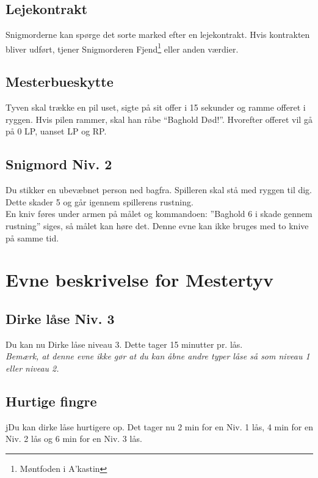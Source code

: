 


\subsection{Lejekontrakt}
Snigmorderne kan spørge det sorte marked efter en lejekontrakt. Hvis kontrakten
bliver udført, tjener Snigmorderen Fjend\footnote{Møntfoden i A'kastin} eller anden værdier.\\

\subsection{Mesterbueskytte}
Tyven skal trække en pil uset, sigte på sit offer i 15 sekunder og ramme offeret i ryggen. Hvis pilen rammer, skal han råbe “Baghold Død!”. Hvorefter offeret vil gå på 0 LP, uanset LP og RP.\\

\subsection{Snigmord Niv. 2}
Du stikker en ubevæbnet person ned bagfra. Spilleren skal stå med ryggen til dig. Dette skader 5 og går igennem spillerens rustning.\\ 
En kniv føres under armen på målet og kommandoen: ”Baghold 6 i skade gennem rustning” siges, så målet kan høre det. Denne evne kan ikke bruges med to knive på samme tid.\\



\section{Evne beskrivelse for Mestertyv}

\subsection{Dirke låse Niv. 3}
Du kan nu Dirke låse niveau 3. Dette tager 15 minutter pr. lås.\\
\emph{Bemærk, at denne evne ikke gør at du kan åbne andre typer låse så som niveau 1 eller niveau 2.}\\

\subsection{Hurtige fingre}
jDu kan dirke låse hurtigere op. Det tager nu 2 min for en Niv. 1 lås, 4 min for en Niv. 2 lås og 6 min for en Niv. 3 lås.\\

